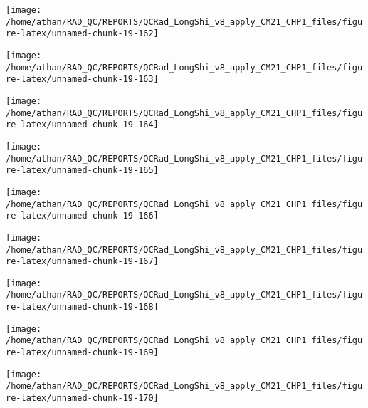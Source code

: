\documentclass[
  10pt,
  a4paper,oneside]{article}
\begin{document}
\begin{center}\texttt{[image: /home/athan/RAD\_QC/REPORTS/QCRad\_LongShi\_v8\_apply\_CM21\_CHP1\_files/figure-latex/unnamed-chunk-19-162]} \end{center}

\begin{center}\texttt{[image: /home/athan/RAD\_QC/REPORTS/QCRad\_LongShi\_v8\_apply\_CM21\_CHP1\_files/figure-latex/unnamed-chunk-19-163]} \end{center}

\begin{center}\texttt{[image: /home/athan/RAD\_QC/REPORTS/QCRad\_LongShi\_v8\_apply\_CM21\_CHP1\_files/figure-latex/unnamed-chunk-19-164]} \end{center}

\begin{center}\texttt{[image: /home/athan/RAD\_QC/REPORTS/QCRad\_LongShi\_v8\_apply\_CM21\_CHP1\_files/figure-latex/unnamed-chunk-19-165]} \end{center}

\begin{center}\texttt{[image: /home/athan/RAD\_QC/REPORTS/QCRad\_LongShi\_v8\_apply\_CM21\_CHP1\_files/figure-latex/unnamed-chunk-19-166]} \end{center}

\begin{center}\texttt{[image: /home/athan/RAD\_QC/REPORTS/QCRad\_LongShi\_v8\_apply\_CM21\_CHP1\_files/figure-latex/unnamed-chunk-19-167]} \end{center}

\begin{center}\texttt{[image: /home/athan/RAD\_QC/REPORTS/QCRad\_LongShi\_v8\_apply\_CM21\_CHP1\_files/figure-latex/unnamed-chunk-19-168]} \end{center}

\begin{center}\texttt{[image: /home/athan/RAD\_QC/REPORTS/QCRad\_LongShi\_v8\_apply\_CM21\_CHP1\_files/figure-latex/unnamed-chunk-19-169]} \end{center}

\begin{center}\texttt{[image: /home/athan/RAD\_QC/REPORTS/QCRad\_LongShi\_v8\_apply\_CM21\_CHP1\_files/figure-latex/unnamed-chunk-19-170]} \end{center}
\end{document}
